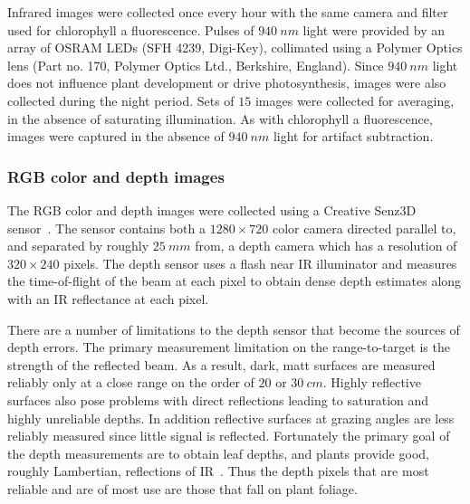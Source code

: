Infrared images were collected once every hour with the same camera and filter used for chlorophyll a fluorescence.
Pulses of $940~nm$ light were provided by an array of OSRAM LEDs (SFH 4239, Digi-Key), collimated using a Polymer Optics lens (Part no. 170, Polymer Optics Ltd., Berkshire, England).
Since $940~nm$ light does not influence plant development or drive photosynthesis, images were also collected during the night period.
Sets of $15$ images were collected for averaging, in the absence of saturating illumination.
As with chlorophyll a fluorescence, images were captured in the absence of $940~nm$ light for artifact subtraction.



\subsubsection{RGB color and depth images} %

The RGB color and depth images were collected using a Creative Senz3D sensor~\cite{nguyen2015vietnamese}. The sensor contains both a $1280 \times 720$ color camera directed parallel to, and separated by roughly $25~mm$ from, a depth camera which has a resolution of $320\times240$ pixels.
The depth sensor uses a flash near IR illuminator and measures the time-of-flight of the beam at each pixel to obtain dense depth estimates along with an IR reflectance at each pixel.

There are a number of limitations to the depth sensor that become the sources of depth errors.
The primary measurement limitation on the range-to-target is the strength of the reflected beam.
As a result, dark, matt surfaces are measured reliably only at a close range on the order of $20$ or $30~cm$.
Highly reflective surfaces also pose problems with direct reflections leading to saturation and highly unreliable depths.
In addition reflective surfaces at grazing angles are less reliably measured since little signal is reflected.
Fortunately the primary goal of the depth measurements are to obtain leaf depths, and plants provide good, roughly Lambertian, reflections of IR~\cite{Chelle2006219}.  Thus the depth pixels that are most reliable and are of most use are those that fall on plant foliage.

